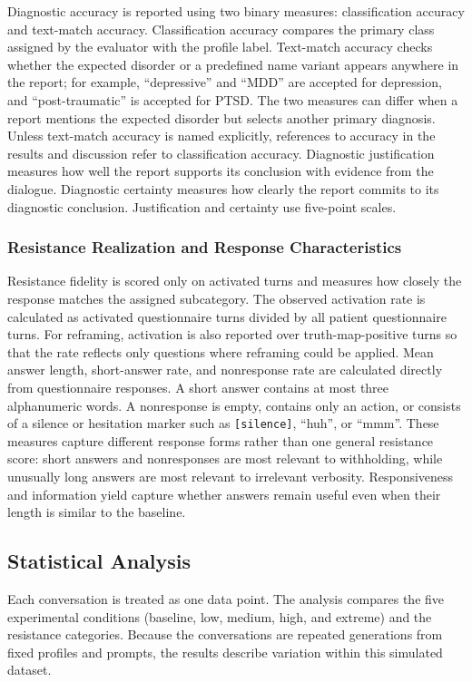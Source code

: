 Diagnostic accuracy is reported using two binary measures: classification accuracy and text-match accuracy. Classification accuracy compares the primary class assigned by the evaluator with the profile label. Text-match accuracy checks whether the expected disorder or a predefined name variant appears anywhere in the report; for example, ``depressive'' and ``MDD'' are accepted for depression, and ``post-traumatic'' is accepted for PTSD. The two measures can differ when a report mentions the expected disorder but selects another primary diagnosis. Unless text-match accuracy is named explicitly, references to accuracy in the results and discussion refer to classification accuracy. Diagnostic justification measures how well the report supports its conclusion with evidence from the dialogue. Diagnostic certainty measures how clearly the report commits to its diagnostic conclusion. Justification and certainty use five-point scales.

\subsubsection{Resistance Realization and Response Characteristics}

Resistance fidelity is scored only on activated turns and measures how closely the response matches the assigned subcategory. The observed activation rate is calculated as activated questionnaire turns divided by all patient questionnaire turns. For reframing, activation is also reported over truth-map-positive turns so that the rate reflects only questions where reframing could be applied. Mean answer length, short-answer rate, and nonresponse rate are calculated directly from questionnaire responses. A short answer contains at most three alphanumeric words. A nonresponse is empty, contains only an action, or consists of a silence or hesitation marker such as \texttt{[silence]}, ``huh'', or ``mmm''. These measures capture different response forms rather than one general resistance score: short answers and nonresponses are most relevant to withholding, while unusually long answers are most relevant to irrelevant verbosity. Responsiveness and information yield capture whether answers remain useful even when their length is similar to the baseline.

\subsection{Statistical Analysis}

Each conversation is treated as one data point. The analysis compares the five experimental conditions (baseline, low, medium, high, and extreme) and the resistance categories. Because the conversations are repeated generations from fixed profiles and prompts, the results describe variation within this simulated dataset.

